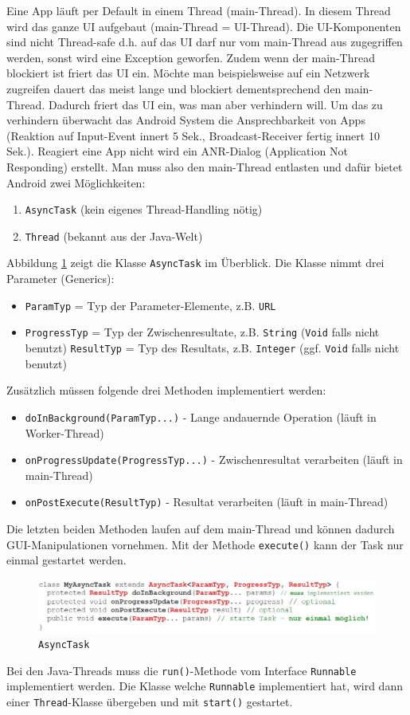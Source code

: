 Eine App läuft per Default in einem Thread (main-Thread). In diesem Thread wird das ganze UI aufgebaut (main-Thread = UI-Thread). Die UI-Komponenten sind nicht Thread-safe d.h. auf das UI darf nur vom main-Thread aus zugegriffen werden, sonst wird eine Exception geworfen. Zudem wenn der main-Thread blockiert ist friert das UI ein. Möchte man beispielsweise auf ein Netzwerk zugreifen dauert das meist lange und blockiert dementsprechend den main-Thread. Dadurch friert das UI ein, was man aber verhindern will. Um das zu verhindern überwacht das Android System die Ansprechbarkeit von Apps (Reaktion auf Input-Event innert 5 Sek., Broadcast-Receiver fertig innert 10 Sek.). Reagiert eine App nicht wird ein ANR-Dialog (Application Not Responding) erstellt.
Man muss also den main-Thread entlasten und dafür bietet Android zwei Möglichkeiten:
\begin{enumerate}
	\item \texttt{AsyncTask} (kein eigenes Thread-Handling nötig)
	\item \texttt{Thread} (bekannt aus der Java-Welt)
\end{enumerate}
Abbildung \ref{fig:asynctask} zeigt die Klasse \texttt{AsyncTask} im Überblick. Die Klasse nimmt drei Parameter (Generics):
\begin{itemize}
	\item \texttt{ParamTyp} = Typ der Parameter-Elemente, z.B. \texttt{URL}
	\item \texttt{ProgressTyp} = Typ der Zwischenresultate, z.B. \texttt{String} (\texttt{Void} falls nicht benutzt)
	\texttt{ResultTyp} = Typ des Resultats, z.B. \texttt{Integer} (ggf. \texttt{Void} falls nicht benutzt)
\end{itemize}
Zusätzlich müssen folgende drei Methoden implementiert werden:
\begin{itemize}
	\item \texttt{doInBackground(ParamTyp...)} - Lange andauernde Operation (läuft in Worker-Thread)
	\item \texttt{onProgressUpdate(ProgressTyp...)} - Zwischenresultat verarbeiten (läuft in main-Thread)
	\item \texttt{onPostExecute(ResultTyp)} - Resultat verarbeiten (läuft in main-Thread)
\end{itemize}
Die letzten beiden Methoden laufen auf dem main-Thread und können dadurch GUI-Manipulationen vornehmen. Mit der Methode \texttt{execute()} kann der Task nur einmal gestartet werden.

\begin{figure}
\centering
\includegraphics[width=\linewidth]{fig/asynctask}
\caption{\texttt{AsyncTask}}
\label{fig:asynctask}
\end{figure}

Bei den Java-Threads muss die \texttt{run()}-Methode vom Interface \texttt{Runnable} implementiert werden. Die Klasse welche \texttt{Runnable} implementiert hat, wird dann einer \texttt{Thread}-Klasse übergeben und mit \texttt{start()} gestartet. 